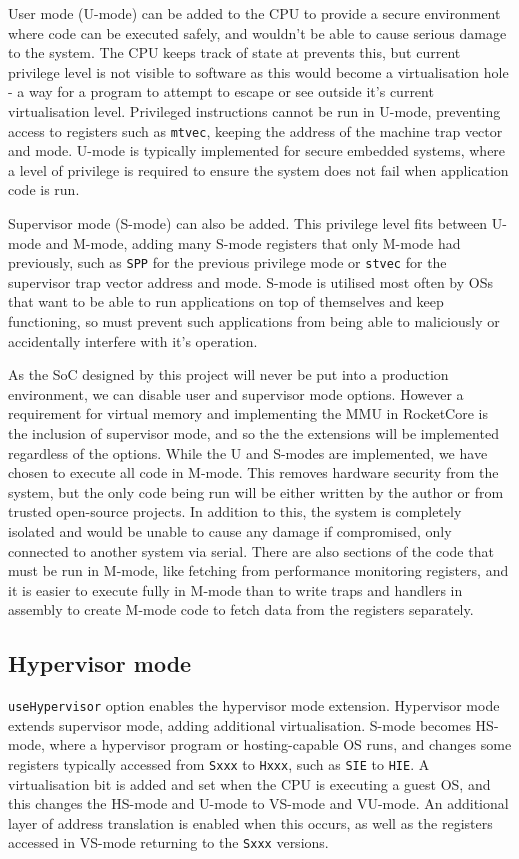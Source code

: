User mode (U-mode) can be added to the CPU to provide a secure environment where code can be executed safely, and wouldn't be able to cause serious damage to the system. The CPU keeps track of state at prevents this, but current privilege level is not visible to software as this would become a virtualisation hole - a way for a program to attempt to escape or see outside it's current virtualisation level. Privileged instructions cannot be run in U-mode, preventing access to registers such as \texttt{mtvec}, keeping the address of the machine trap vector and mode. U-mode is typically implemented for secure embedded systems, where a level of privilege is required to ensure the system does not fail when application code is run.

Supervisor mode (S-mode) can also be added. This privilege level fits between U-mode and M-mode, adding many S-mode registers that only M-mode had previously, such as \texttt{SPP} for the previous privilege mode or \texttt{stvec} for the supervisor trap vector address and mode. S-mode is utilised most often by OSs that want to be able to run applications on top of themselves and keep functioning, so must prevent such applications from being able to maliciously or accidentally interfere with it's operation.

As the SoC designed by this project will never be put into a production environment, we can disable user and supervisor mode options. However a requirement for virtual memory and implementing the MMU in RocketCore is the inclusion of supervisor mode, and so the the extensions will be implemented regardless of the options. While the U and S-modes are implemented, we have chosen to execute all code in M-mode. This removes hardware security from the system, but the only code being run will be either written by the author or from trusted open-source projects. In addition to this, the system is completely isolated and would be unable to cause any damage if compromised, only connected to another system via serial. There are also sections of the code that must be run in M-mode, like fetching from performance monitoring registers, and it is easier to execute fully in M-mode than to write traps and handlers in assembly to create M-mode code to fetch data from the registers separately.

\subsection{Hypervisor mode}
\texttt{useHypervisor} option enables the hypervisor mode extension. Hypervisor mode extends supervisor mode, adding additional virtualisation. S-mode becomes HS-mode, where a hypervisor program or hosting-capable OS runs, and changes some registers typically accessed from \texttt{Sxxx} to \texttt{Hxxx}, such as \texttt{SIE} to \texttt{HIE}. A virtualisation bit is added and set when the CPU is executing a guest OS, and this changes the HS-mode and U-mode to VS-mode and VU-mode. An additional layer of address translation is enabled when this occurs, as well as the registers accessed in VS-mode returning to the \texttt{Sxxx} versions.

